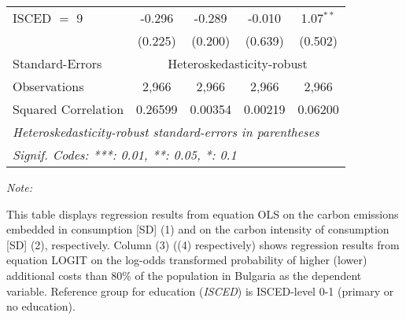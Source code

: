 \begin{table}[htbp!]
\begin{adjustbox}{width = 1\textwidth, max height = 0.95\textheight, center}
\begin{threeparttable}[b]
\begin{tabular}{lcccc}
            ISCED $=$ 9          & -0.296             & -0.289             & -0.010      & 1.07$^{**}$\\   
                                 & (0.225)            & (0.200)            & (0.639)     & (0.502)\\   
            \midrule 
            Standard-Errors & \multicolumn{4}{c}{Heteroskedasticity-robust} \\ 
            Observations         & 2,966              & 2,966              & 2,966       & 2,966\\  
            Squared Correlation  & 0.26599            & 0.00354            & 0.00219     & 0.06200\\  
            \midrule \midrule
            \multicolumn{5}{l}{\emph{Heteroskedasticity-robust standard-errors in parentheses}}\\
            \multicolumn{5}{l}{\emph{Signif. Codes: ***: 0.01, **: 0.05, *: 0.1}}\\
         \end{tabular}
         
         \begin{tablenotes}\item \medskip \textit{Note:}
            \item This table displays regression results from equation OLS on the carbon emissions embedded in consumption [SD] (1) and on the carbon intensity of consumption [SD] (2), respectively. 
                                      Column (3) ((4) respectively) shows regression results from equation LOGIT on the log-odds transformed probability of higher (lower) additional costs than 80\% of the population in Bulgaria as the dependent variable. Reference group for education (\textit{ISCED}) is ISCED-level 0-1 (primary or no education).
         \end{tablenotes}
      \end{threeparttable}
   \end{adjustbox}
\end{table}


